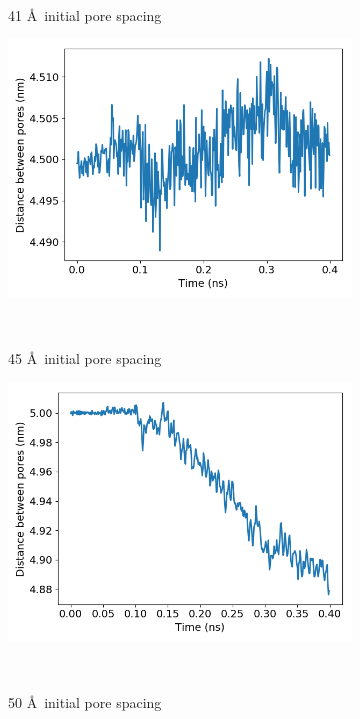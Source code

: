 \documentclass{article}
\begin{document}
\begin{enumerate}
\begin{figure}[htp]
\begin{subfigure}{0.3\textwidth}
			\caption{41 \AA~initial pore spacing}~\label{fig:p2p_41}
		\end{subfigure}
		\begin{subfigure}{0.3\textwidth}
			\includegraphics[width=\textwidth]{p2p_45.png}
			\vspace{-1.25em}
			\caption{45 \AA~initial pore spacing}~\label{fig:p2p_45}
		\end{subfigure}
		\begin{subfigure}{0.3\textwidth}
			\includegraphics[width=\textwidth]{p2p_50.png}\quad	
			\vspace{-1.25em}
			\caption{50 \AA~initial pore spacing}~\label{fig:p2p_50}
		\end{subfigure}
		\begin{subfigure}{0.3\textwidth}

\end{subfigure}
\end{figure}
\end{enumerate}
\end{document}
